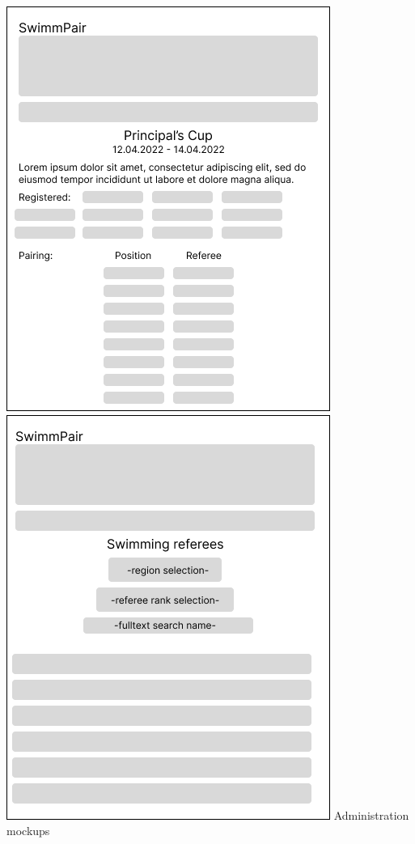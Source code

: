 \newline
\includegraphics[scale=0.507]{img/def-U-Cup.png}
\includegraphics[scale=0.507]{img/def-U-ListingUsers.png}
\newpage
Administration mockups
